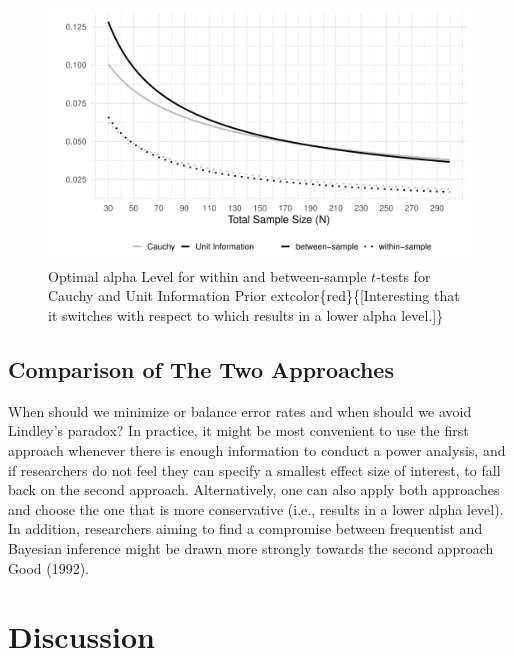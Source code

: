 \documentclass[
  english,
  ,jou, a4paper,floatsintext]{apa6}
\begin{document}
\begin{figure}
\centering
\includegraphics{Justify_in_Practice_files/figure-latex/lindley-1.pdf}
\caption{\label{fig:lindley}Optimal alpha Level for within and between-sample \(t\)-tests for Cauchy and Unit Information Prior extcolor\{red\}\{{[}Interesting that it switches with respect to which results in a lower alpha level.{]}\}}
\end{figure}

\hypertarget{comparison-of-the-two-approaches}{%
\subsection{Comparison of The Two Approaches}\label{comparison-of-the-two-approaches}}

When should we minimize or balance error rates and when should we avoid Lindley's paradox? In practice, it might be most convenient to use the first approach whenever there is enough information to conduct a power analysis, and if researchers do not feel they can specify a smallest effect size of interest, to fall back on the second approach. Alternatively, one can also apply both approaches and choose the one that is more conservative (i.e., results in a lower alpha level). In addition, researchers aiming to find a compromise between frequentist and Bayesian inference might be drawn more strongly towards the second approach Good (1992).

\hypertarget{discussion}{%
\section{Discussion}\label{discussion}}
\end{document}
